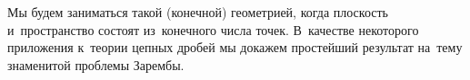 



Мы будем заниматься такой (конечной) геометрией, когда плоскость и~пространство
состоят из~конечного числа точек.
В~качестве некоторого приложения к~теории цепных дробей мы докажем простейший
результат на~тему знаменитой проблемы Зарембы.

